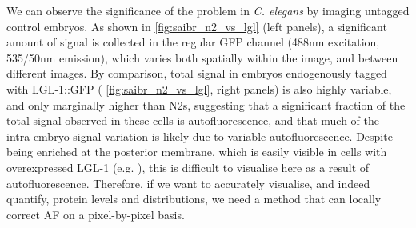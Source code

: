 \documentclass[12pt]{"article"}
\begin{document}
We can observe the significance of the problem in \textit{C. elegans} by imaging untagged control embryos. As shown in \cref{fig:saibr_n2_vs_lgl} (left panels), a significant amount of signal is collected in the regular GFP channel (488nm excitation, 535/50nm emission), which varies both spatially within the image, and between different images. By comparison, total signal in embryos endogenously tagged with LGL-1::GFP ( \cref{fig:saibr_n2_vs_lgl}, right panels) is also highly variable, and only marginally higher than N2s, suggesting that a significant fraction of the total signal observed in these cells is autofluorescence, and that much of the intra-embryo signal variation is likely due to variable autofluorescence. Despite being enriched at the posterior membrane, which is easily visible in cells with overexpressed LGL-1 (e.g. \cite{Hoege2010}), this is difficult to visualise here as a result of autofluorescence. Therefore, if we want to accurately visualise, and indeed quantify, protein levels and distributions, we need a method that can locally correct AF on a pixel-by-pixel basis.\\
\end{document}
